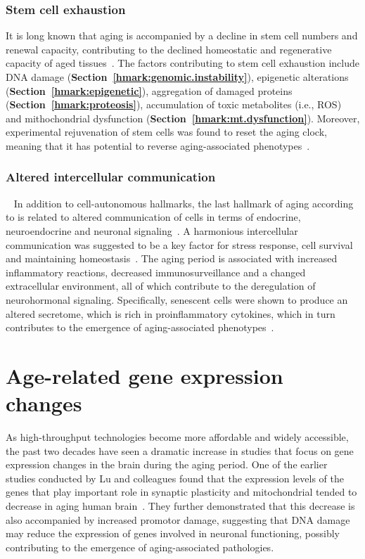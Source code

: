\subsubsection{Stem cell exhaustion}
It is long known that aging is accompanied by a decline in stem cell numbers and renewal capacity, 
contributing to the declined homeostatic and regenerative capacity of aged tissues~\autocite{Oh2014}.
The factors contributing to stem cell exhaustion include
DNA damage (\textbf{Section~\ref{hmark:genomic.instability}}), 
epigenetic alterations (\textbf{Section~\ref{hmark:epigenetic}}), 
aggregation of damaged proteins (\textbf{Section~\ref{hmark:proteosis}}),
accumulation of toxic metabolites (i.e., ROS) and
mithochondrial dysfunction (\textbf{Section~\ref{hmark:mt.dysfunction}}).
Moreover, experimental rejuvenation of stem cells was found to reset the aging clock, 
meaning that it has potential to reverse aging-associated phenotypes~\autocite{Rando2012}.

\subsubsection{Altered intercellular communication}~\label{hmark:altered.comm}
In addition to cell-autonomous hallmarks, the last hallmark of aging according to \textcite{Lopez2013} is related to altered communication of cells 
in terms of endocrine, neuroendocrine and neuronal signaling~\autocite{Russell2007}.
A harmonious intercellular communication was suggested to be a key factor for stress response, cell survival and maintaining homeostasis~\autocite{Tan2021}.
The aging period is associated with increased inflammatory reactions, decreased immunosurveillance and a changed extracellular environment,
all of which contribute to the deregulation of neurohormonal signaling.
Specifically, senescent cells were shown to produce an altered secretome, which is rich in proinflammatory cytokines, 
which in turn contributes to the emergence of aging-associated phenotypes~\autocite{Childs2016, Kuilman2010}.

\section{Age-related gene expression changes}
As high-throughput technologies become more affordable and widely accessible, 
the past two decades have seen a dramatic increase in studies that focus on gene expression changes in the brain during the aging period.
One of the earlier studies conducted by Lu and colleagues found that the expression levels of the genes 
that play important role in synaptic plasticity and mitochondrial tended to decrease in aging human brain~\autocite{Lu2004}. 
They further demonstrated that this decrease is also accompanied by increased promotor damage, 
suggesting that DNA damage may reduce the expression of genes involved in neuronal functioning, 
possibly contributing to the emergence of aging-associated pathologies.

